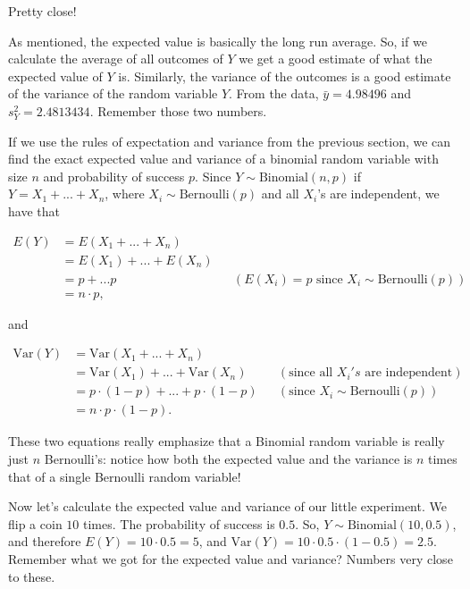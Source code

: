 \documentclass[]{book}
\theoremstyle{definition}
\theoremstyle{definition}
\theoremstyle{definition}
\theoremstyle{remark}
\begin{document}
\hypertarget{htmlwidget-b11304a5a5b59d838d47}{}

Pretty close!

As mentioned, the expected value is basically the long run average. So, if we calculate the average of all outcomes of \(Y\) we get a good estimate of what the expected value of \(Y\) is. Similarly, the variance of the outcomes is a good estimate of the variance of the random variable \(Y\). From the data, \(\bar{y} = 4.98496\) and \(s_Y^2 = 2.4813434\). Remember those two numbers.

If we use the rules of expectation and variance from the previous section, we can find the exact expected value and variance of a binomial random variable with size \(n\) and probability of success \(p\). Since \(Y \sim \text{Binomial}(n,p)\) if \(Y = X_1 + ... + X_n\), where \(X_i \sim \text{Bernoulli}(p)\) and all \(X_i\)'s are independent, we have that

\begin{align*}
  E(Y) &= E(X_1 + ... + X_n) && \\
       &= E(X_1) + ... + E(X_n) && \\
       &= p + ... p && (E(X_i) = p \text{ since } X_i \sim \text{Bernoulli}(p)) \\
       &= n\cdot p, &&
\end{align*}

and

\begin{align*}
  \text{Var}(Y) &= \text{Var}(X_1 + ... + X_n) && \\
          &= \text{Var}(X_1) + ... + \text{Var}(X_n) && (\text{since all } X_i's \text{ are independent}) \\
          &= p\cdot(1-p) + ... + p\cdot(1-p) && (\text{since } X_i \sim \text{Bernoulli}(p)) \\
          &= n\cdot p \cdot (1-p). &&
\end{align*}

These two equations really emphasize that a Binomial random variable is really just \(n\) Bernoulli's: notice how both the expected value and the variance is \(n\) times that of a single Bernoulli random variable!

Now let's calculate the expected value and variance of our little experiment. We flip a coin \(10\) times. The probability of success is \(0.5\). So, \(Y \sim \text{Binomial}(10, 0.5)\), and therefore \(E(Y) = 10 \cdot 0.5 = 5\), and \(\text{Var}(Y) = 10 \cdot 0.5 \cdot (1-0.5) = 2.5\). Remember what we got for the expected value and variance? Numbers very close to these.
\end{document}
